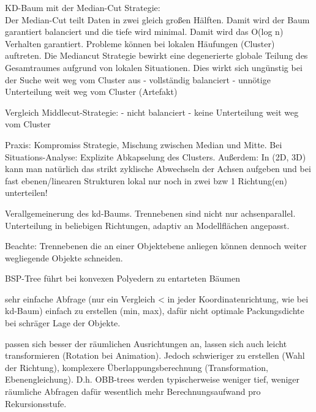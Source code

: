 \documentclass[10pt,landscape]{article}
\begin{document}
\begin{multicols}{3}
KD-Baum mit der Median-Cut Strategie:\\
Der Median-Cut teilt Daten in zwei gleich großen Hälften. Damit wird der Baum garantiert balanciert und die tiefe wird minimal. Damit wird das O(log n) Verhalten garantiert. Probleme können bei lokalen Häufungen (Cluster) auftreten. Die Mediancut Strategie bewirkt eine degenerierte globale Teilung des Gesamtraumes aufgrund von lokalen Situationen. Dies wirkt sich ungünstig bei der Suche weit weg vom Cluster aus
- vollständig balanciert
- unnötige Unterteilung weit weg vom Cluster (Artefakt)

Vergleich Middlecut-Strategie:
- nicht balanciert
- keine Unterteilung weit weg vom Cluster

Praxis: Kompromiss Strategie, Mischung zwischen Median und Mitte. Bei Situations-Analyse: Explizite Abkapselung des Clusters. Außerdem: In (2D, 3D) kann man natürlich das strikt zyklische Abwechseln der Achsen aufgeben und bei fast ebenen/linearen Strukturen lokal nur noch in zwei bzw 1 Richtung(en) unterteilen!

Verallgemeinerung des kd-Baums. Trennebenen sind nicht nur achsenparallel. Unterteilung in beliebigen Richtungen, adaptiv an Modellflächen angepasst.

Beachte: Trennebenen die an einer Objektebene anliegen können dennoch weiter wegliegende Objekte schneiden.

BSP-Tree führt bei konvexen Polyedern zu entarteten Bäumen

sehr einfache Abfrage (nur ein Vergleich < in jeder Koordinatenrichtung, wie bei kd-Baum) einfach zu erstellen (min, max), dafür nicht optimale Packungsdichte bei schräger Lage der Objekte.

passen sich besser der räumlichen Ausrichtungen an, lassen sich auch leicht transformieren (Rotation bei Animation). Jedoch schwieriger zu erstellen (Wahl der Richtung), komplexere Überlappungsberechnung (Transformation, Ebenengleichung).
D.h. OBB-trees werden typischerweise weniger tief, weniger räumliche Abfragen dafür wesentlich mehr Berechnungsaufwand pro Rekursionsstufe. 


\end{multicols}
\end{document}

